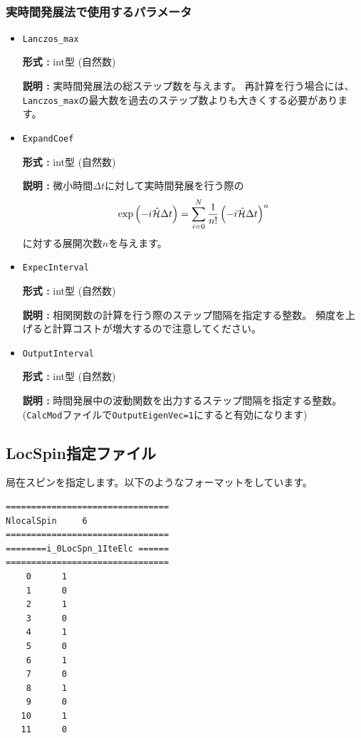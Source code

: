 ~\subsubsection{実時間発展法で使用するパラメータ}
\begin{itemize}     
 \item  \verb|Lanczos_max|

{\bf 形式 :} int型 (自然数)

{\bf 説明 :}  実時間発展法の総ステップ数を与えます。
再計算を行う場合には、\verb|Lanczos_max|の最大数を過去のステップ数よりも大きくする必要があります。

 \item  \verb|ExpandCoef|

{\bf 形式 :} int型 (自然数)

{\bf 説明 :}  微小時間$\Delta t$に対して実時間発展を行う際の
\begin{equation}
\exp\left(-i \hat{\cal H} \Delta t \right) = \sum_{i=0}^{N}\frac{1}{n!}\left(-i \hat{\cal H} \Delta t \right)^n
\end{equation}
に対する展開次数$n$を与えます。

\item \verb|ExpecInterval|

{\bf 形式 :} int型 (自然数)

{\bf 説明 :} 相関関数の計算を行う際のステップ間隔を指定する整数。
頻度を上げると計算コストが増大するので注意してください。

\item \verb|OutputInterval|

{\bf 形式 :} int型 (自然数)

{\bf 説明 :} 時間発展中の波動関数を出力するステップ間隔を指定する整数。
(\verb|CalcMod|ファイルで\verb|OutputEigenVec=1|にすると有効になります)


\end{itemize}

\newpage
\subsection{LocSpin指定ファイル}
\label{Subsec:locspn}
局在スピンを指定します。以下のようなフォーマットをしています。\\
\begin{minipage}{10cm}
\begin{screen}
\begin{verbatim}
================================ 
NlocalSpin     6  
================================ 
========i_0LocSpn_1IteElc ====== 
================================ 
    0      1
    1      0
    2      1
    3      0
    4      1
    5      0
    6      1
    7      0
    8      1
    9      0
   10      1
   11      0
\end{verbatim}
\end{screen}
\end{minipage}


